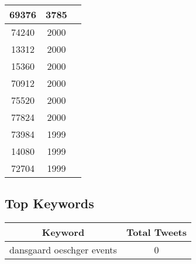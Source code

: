 \documentclass{article}\usepackage[T1]{fontenc}
\begin{document}
\begin{tabular}{|c|c|c|}
 \hline
69376 & 3785\\ 
 \hline
74240 & 2000\\ 
 \hline
13312 & 2000\\ 
 \hline
15360 & 2000\\ 
 \hline
70912 & 2000\\ 
 \hline
75520 & 2000\\ 
 \hline
77824 & 2000\\ 
 \hline
73984 & 1999\\ 
 \hline
14080 & 1999\\ 
 \hline
72704 & 1999\\ 
 \hline
\end{tabular}\subsection*{Top Keywords}\begin{tabular}{|c|c|}         \hline         Keyword & Total Tweets \\ 
 \hline
dansgaard oeschger events & 0\\ 
 \hline
\end{tabular}
\end{document}
